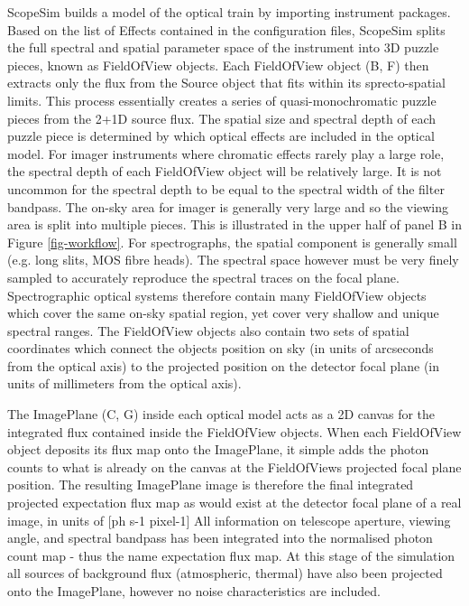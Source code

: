 ScopeSim builds a model of the optical train by importing instrument packages.
Based on the list of Effects contained in the configuration files, ScopeSim splits the full spectral and spatial parameter space of the instrument into 3D \textquotedbl{}puzzle\textquotedbl{} pieces, known as FieldOfView objects.
Each FieldOfView object (B, F) then extracts only the flux from the Source object that fits within its sprecto-spatial limits.
This process essentially creates a series of quasi-monochromatic puzzle pieces from the 2+1D source flux.
The spatial size and spectral depth of each puzzle piece is determined by which optical effects are included in the optical model.
For imager instruments where chromatic effects rarely play a large role, the spectral depth of each FieldOfView object will be relatively large.
It is not uncommon for the spectral depth to be equal to the spectral width of the filter bandpass.
The on-sky area for imager is generally very large and so the viewing area is split into multiple pieces.
This is illustrated in the upper half of panel B in Figure \ref{fig-workflow}.
For spectrographs, the spatial component is generally small (e.g. long slits, MOS fibre heads).
The spectral space however must be very finely sampled to accurately reproduce the spectral traces on the focal plane.
Spectrographic optical systems therefore contain many FieldOfView objects which cover the same on-sky spatial region, yet cover very shallow and unique spectral ranges.
The FieldOfView objects also contain two sets of spatial coordinates which connect the objects position on sky (in units of arcseconds from the optical axis) to the projected position on the detector focal plane (in units of millimeters from the optical axis).

The ImagePlane (C, G) inside each optical model acts as a 2D canvas for the integrated flux contained inside the FieldOfView objects.
When each FieldOfView object deposits its flux map onto the ImagePlane, it simple adds the photon counts to what is already on the canvas at the FieldOfViews projected focal plane position.
The resulting ImagePlane image is therefore the final integrated projected expectation flux map as would exist at the detector focal plane of a real image, in units of {[}ph s-1 pixel-1{]}
All information on telescope aperture, viewing angle, and spectral bandpass has been integrated into the normalised photon count map - thus the name \textquotedbl{}expectation\textquotedbl{} flux map.
At this stage of the simulation all sources of background flux (atmospheric, thermal) have also been projected onto the ImagePlane, however no noise characteristics are included.

